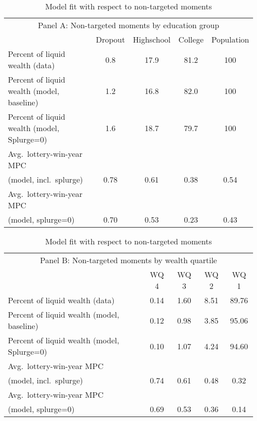 \documentclass{econsocart}
\begin{document}
\begin{table}[tb] 
  \caption{Model fit with respect to non-targeted moments}
  \label{tab:nonTargetedMoments-wSplZero} 
  \centering

  \begin{tabular*}
    {\textwidth}{@{\extracolsep{\fill}}lcccc@{}}
    \multicolumn{5}{c}{\small Panel A: Non-targeted moments by education group} \\
    \addlinespace
    \hline
    & Dropout & Highschool & College & Population \\ \hline
    Percent of liquid wealth (data)             & 0.8  & 17.9 & 81.2 & 100 \\
    Percent of liquid wealth (model, baseline)  & 1.2  & 16.8 & 82.0 & 100 \\
    Percent of liquid wealth (model, Splurge=0) & 1.6  & 18.7 & 79.7 & 100 \\
    \addlinespace
    Avg.\ lottery-win-year MPC \\ \quad (model, incl.\ splurge) & 0.78 & 0.61 & 0.38 & 0.54 \\
    Avg.\ lottery-win-year MPC \\ \quad (model, splurge=0)     & 0.70 & 0.53 & 0.23 & 0.43 \\
    \hline
  \end{tabular*}

  \vspace{0.5em}

  \begin{tabular*}
    {\textwidth}{@{\extracolsep{\fill}}lcccc@{}}
    \multicolumn{5}{c}{\small Panel B: Non-targeted moments by wealth quartile} \\
    \addlinespace
    \hline
    & WQ 4 & WQ 3 & WQ 2 & WQ 1 \\ \hline
    Percent of liquid wealth (data)             & 0.14 & 1.60 & 8.51 & 89.76 \\
    Percent of liquid wealth (model, baseline)  & 0.12 & 0.98 & 3.85 & 95.06 \\
    Percent of liquid wealth (model, Splurge=0) & 0.10 & 1.07 & 4.24 & 94.60 \\
    \addlinespace
    Avg.\ lottery-win-year MPC \\ \quad (model, incl.\ splurge) & 0.74 & 0.61 & 0.48 & 0.32 \\
    Avg.\ lottery-win-year MPC \\ \quad (model, splurge=0)     & 0.69 & 0.53 & 0.36 & 0.14 \\
    \hline
  \end{tabular*}


\end{table}
\end{document}
